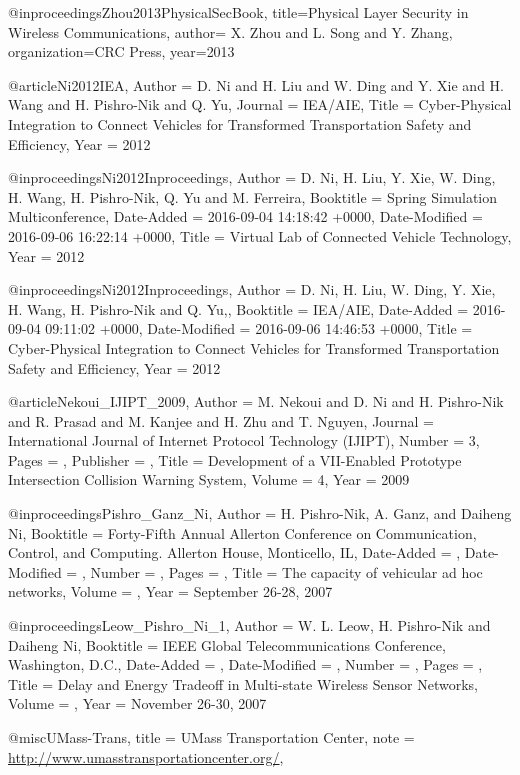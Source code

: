 {{{{{{@inproceedings{Zhou2013PhysicalSecBook,
	title={Physical Layer Security in Wireless Communications},
	author={ X. Zhou and L. Song and Y. Zhang},
	organization={CRC Press},
	year={2013}
}

@article{Ni2012IEA,
	Author = {D. Ni and H. Liu and W. Ding and  Y. Xie and H. Wang and H. Pishro-Nik and Q. Yu},
	Journal = {IEA/AIE},
	Title = {Cyber-Physical Integration to Connect Vehicles for Transformed Transportation Safety and Efficiency},
	Year = {2012}}



@inproceedings{Ni2012Inproceedings,
	Author = {D. Ni, H. Liu, Y. Xie, W. Ding, H. Wang, H. Pishro-Nik, Q. Yu and M. Ferreira},
	Booktitle = {Spring Simulation Multiconference},
	Date-Added = {2016-09-04 14:18:42 +0000},
	Date-Modified = {2016-09-06 16:22:14 +0000},
	Title = {Virtual Lab of Connected Vehicle Technology},
	Year = {2012}}

@inproceedings{Ni2012Inproceedings,
	Author = {D. Ni, H. Liu, W. Ding, Y. Xie, H. Wang, H. Pishro-Nik and Q. Yu,},
	Booktitle = {IEA/AIE},
	Date-Added = {2016-09-04 09:11:02 +0000},
	Date-Modified = {2016-09-06 14:46:53 +0000},
	Title = {Cyber-Physical Integration to Connect Vehicles for Transformed Transportation Safety and Efficiency},
	Year = {2012}}


@article{Nekoui_IJIPT_2009,
	Author = {M. Nekoui and D. Ni and H. Pishro-Nik and R. Prasad and M. Kanjee and H. Zhu and T. Nguyen},
	Journal = {International Journal of Internet Protocol Technology (IJIPT)},
	Number = {3},
	Pages = {},
	Publisher = {},
	Title = {Development of a VII-Enabled Prototype Intersection Collision Warning System},
	Volume = {4},
	Year = {2009}}


@inproceedings{Pishro_Ganz_Ni,
	Author = {H. Pishro-Nik, A. Ganz, and Daiheng Ni},
	Booktitle = {Forty-Fifth Annual Allerton Conference on Communication, Control, and Computing. Allerton House, Monticello, IL},
	Date-Added = {},
	Date-Modified = {},
	Number = {},
	Pages = {},
	Title = {The capacity of vehicular ad hoc networks},
	Volume = {},
	Year = {September 26-28, 2007}}

@inproceedings{Leow_Pishro_Ni_1,
	Author = {W. L. Leow, H. Pishro-Nik and Daiheng Ni},
	Booktitle = {IEEE Global Telecommunications Conference, Washington, D.C.},
	Date-Added = {},
	Date-Modified = {},
	Number = {},
	Pages = {},
	Title = {Delay and Energy Tradeoff in Multi-state Wireless Sensor Networks},
	Volume = {},
	Year = {November 26-30, 2007}}


@misc{UMass-Trans,
	title = {{UMass Transportation Center}},
	note = {\url{http://www.umasstransportationcenter.org/}},
}


}}}}}}
